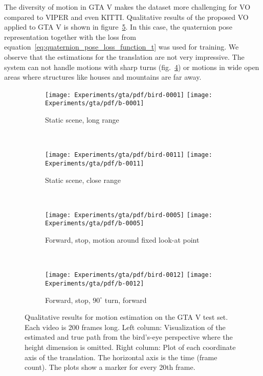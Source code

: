 		The diversity of motion in GTA V makes the dataset more challenging for VO compared to VIPER and even KITTI.
		Qualitative results of the proposed VO applied to GTA V is shown in figure~\ref{fig:gtav-qualitative-results-translation}.
		In this case, the quaternion pose representation together with the loss from equation~\ref{eq:quaternion_pose_loss_function_t} was used for training.
		We observe that the estimations for the translation are not very impressive.
		The system can not handle motions with sharp turns (fig.\@~\ref{fig:gtav-qualitative-sharp-turn}) or motions in wide open areas where structures like houses and mountains are far away.
		\begin{figure}[h]
			\centering
			\begin{subfigure}[b]{\linewidth}
				\centering
				\texttt{[image: Experiments/gta/pdf/bird-0001]}
				\texttt{[image: Experiments/gta/pdf/b-0001]}
				\caption{
					Static scene, long range
					\label{fig:gtav-qualitative-long-range}
				}
			\end{subfigure}%
			\\
			\begin{subfigure}[b]{\linewidth}
				\centering
				\texttt{[image: Experiments/gta/pdf/bird-0011]}
				\texttt{[image: Experiments/gta/pdf/b-0011]}
				\caption{
					Static scene, close range
					\label{fig:gtav-qualitative-close-range}
				}
			\end{subfigure}%
			\\
			\begin{subfigure}[b]{\linewidth}
				\centering
				\texttt{[image: Experiments/gta/pdf/bird-0005]}
				\texttt{[image: Experiments/gta/pdf/b-0005]}
				\caption{
					Forward, stop, motion around fixed look-at point
					\label{fig:gtav-qualitative-look-at-fixed}
				}
			\end{subfigure}%
			\\
			\begin{subfigure}[b]{\linewidth}
				\centering
				\texttt{[image: Experiments/gta/pdf/bird-0012]}
				\texttt{[image: Experiments/gta/pdf/b-0012]}
				\caption{
					Forward, stop, $90^\circ$ turn, forward
					\label{fig:gtav-qualitative-sharp-turn}
				}
			\end{subfigure}%
			\caption[Qualitative results for motion estimation on GTA V]
					{Qualitative results for motion estimation on the GTA V test set.
					 Each video is 200 frames long.
					 Left column: Visualization of the estimated and true path from the bird's-eye perspective where the height dimension is omitted.
					 Right column: Plot of each coordinate axis of the translation.
					 The horizontal axis is the time (frame count).
					 The plots show a marker for every 20th frame.
					 \label{fig:gtav-qualitative-results-translation}}
		\end{figure}
		
